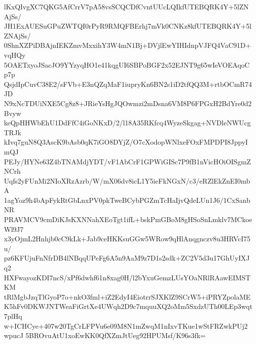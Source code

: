 lKxQIvgXC7QKG5AfCrrV7pA58vsSCQCDfCvntUUcLQIkfUTEBQRK4Y+5lZNAjSs/
JH1ExAUESuGPuZWTQI0rPyR9RMQFBErhj7mVk0CNKz8kfUTEBQRK4Y+5lZNAjSs/
0ShnXZPiDBAjnIEKZmvMxxihY3W4mN1Bj+DVjlEwYIHIdnpVJFQ4VaC91D+vqHQy
5OAETxyoJSacJO9YYzyqHO1e41kqgUI6SBPoBGF2x52EJNT9g65wIeVOEAqoCp7p
QsjdIpCuvC38E2/sFVb+E3nQZqMaF1iupryKn6BN2s1iD2tfQQ3M+rtbOCmR74JD
N9xNcTDUiNXE5Cg8z8+JRieYsHgJQOwmzi2mDsna6VM8P6FPGxH2BdYre0d2Bvyw
keQpHHWbEhU1DdFfC4iGoNKxD/2/l18A35RKfcq4WyzeSkgag+NVDleNWUcgTRJk
kIvq7guN8Q3AscK9bAsb0qK7iGO8DYjZ/O7cXodopWNlxeFOxFMPDPI8JppyImQJ
PEJy/HYNe63Z4bTNAMdjYDT/vF1AbCrF1GPWiGISc7P9fB1nVicHOiOISgmZNCrh
Uqfs2yFUnMi2NIoXRzAzrb/W/mX06dv8icL1Y5ieFkNGxN/c3/eRZlEkZnEI0mbA
1agYoz9h4bApFykRtGbLnxPV0pkTweBCybPGZmTcHaIjvQdeLUn1J6/1CxSanbNR
PRAVMCV9cmDiKJsKXNNahXEoTgt1ifL+bskPmGBoM8gHSoSnLmklv7MCkoeWl9J7
x3yOjmL2Hnhjb0cC9kLk+Jab9ceHKKsuGGw5WRow9qHlAnqgnczv8u3HRVcI75u/
pz6KFUjuFnNfrDB4lNBqqUPeFg6A5n9AaM9z7D1s2sdk+ZC2V5d3u17GhUyIXJq2
HXFwayozKDI7ncS/xPf6dwhf61n8xag0H/l2bYxuGemzLUsYOaNRlRAawEIMSTKM
tRlMgbJzqTlGyoP7o+nkO3fml+iZ2EdyI4EiotrrSJXKlZ9SCrW5+iPRYZpolaME
K5hFv0DKWJNTWeaFiGrtXe4UWqh2D9c7mquuXQ2oMm5SxdzUTh00LEp3wqt7plHq
w+ICHCye+407w20TgCrLFPVu6e09M8N1mZwqM1nIxvTKue1wStFRZwkPUj2wpucJ
5BROvuAtU1xoEwKK0QfXZmJtUeg92HPUMsf/K96s3fk=

